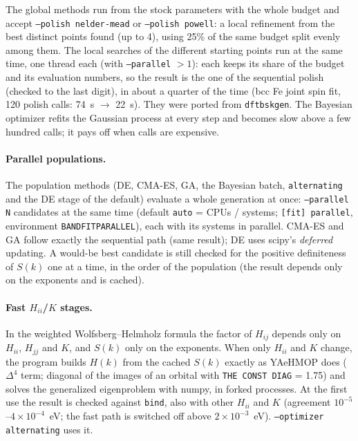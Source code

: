 \documentclass[11pt,a4paper]{article}
\newcommand{\cmd}[1]{\texttt{#1}}
\renewcommand{\_}{\origunderscore\allowbreak}
\begin{document}
The global methods run from the stock parameters with the whole budget and accept
\cmd{--polish nelder-mead} or \cmd{--polish powell}: a local refinement from the best distinct points
found (up to 4), using 25\% of the same budget split evenly among them. The local searches of the different starting points run
at the same time, one thread each (with \cmd{--parallel} $>1$): each keeps its share of the budget and its evaluation numbers, so
the result is the one of the sequential polish (checked to the last digit), in about a quarter of the time (bcc Fe joint spin fit,
120 polish calls: 74~s $\to$ 22~s). They were ported from \cmd{dftb\_sk\_gen}. The Bayesian optimizer refits the Gaussian process
at every step and becomes slow above a few hundred calls; it pays off when calls are expensive.

\paragraph{Parallel populations.} The population methods (DE, CMA-ES, GA, the Bayesian batch, \cmd{alternating}
and the DE stage of the default) evaluate a whole generation at once: \cmd{--parallel N} candidates at the same
time (default \cmd{auto} = CPUs / systems; \cmd{[fit] parallel}, environment \cmd{BANDFIT\_PARALLEL}), each with its
systems in parallel. CMA-ES and GA follow exactly the sequential path (same result); DE uses scipy's
\emph{deferred} updating. A would-be best candidate is still checked for the positive definiteness of $S(k)$ one at
a time, in the order of the population (the result depends only on the exponents and is cached).

\paragraph{Fast $H_{ii}$/$K$ stages.} In the weighted Wolfsberg--Helmholz formula the factor of $H_{ij}$ depends only on
$H_{ii}$, $H_{jj}$ and $K$, and $S(k)$ only on the exponents. When only $H_{ii}$ and $K$ change, the program builds
$H(k)$ from the cached $S(k)$ exactly as YAeHMOP does ($\Delta^4$ term; diagonal of the images of an orbital with
\cmd{THE CONST DIAG} = 1.75) and solves the generalized eigenproblem with numpy, in forked processes. At the first use
the result is checked against \cmd{bind}, also with other $H_{ii}$ and $K$ (agreement $10^{-5}$--$4\times10^{-4}$~eV; the
fast path is switched off above $2\times10^{-3}$~eV). \cmd{--optimizer alternating} uses it.
\end{document}
